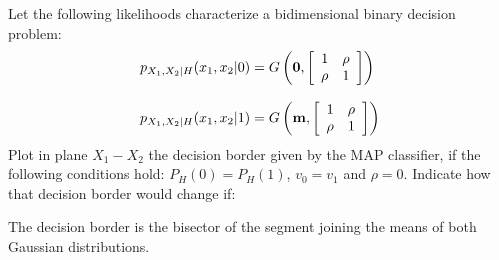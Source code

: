 \question Let the following likelihoods characterize a bidimensional binary decision problem:
 $$ \begin{array}{l} 
					   p_{X_1,X_2|H}(x_1,x_2 | 0) = G \left( {\bf 0}, \left[ \begin{array}{cc}  
					   1 & \rho \\ \rho & 1					   
					    \end{array}  \right] \right)\\ \\
					  p_{X_1,X_2|H}(x_1,x_2 | 1) = G \left( {\bf m}, \left[ \begin{array}{cc}  
					   1 & \rho \\ \rho & 1					   
					    \end{array}  \right] \right)	  
  \end{array}$$
Plot in plane $X_1-X_2$ the decision border given by the MAP classifier, if the following conditions hold: $P_H(0)= P_H (1)$, $v_0=v_1$ and $\rho=0$. Indicate how that decision border would change if:

\begin{solution}
The decision border is the bisector of the segment joining the means of both Gaussian distributions.
\end{solution}

\fi